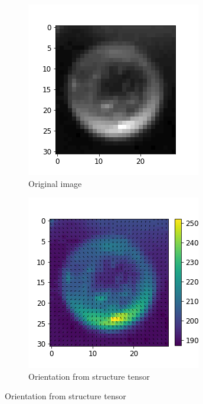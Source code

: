 		\begin{figure}
			\begin{subfigure}[t]{.4\textwidth}
				\centering
				\includegraphics[scale=0.5]{images/struct_tensor_original.png}
				\caption{Original image}		
			\end{subfigure}\hfill
			\begin{subfigure}[t]{.4\textwidth}
				\includegraphics[scale=0.5]{images/struct_tensor_orientation.png}
				\caption{Orientation from structure tensor}		
			\end{subfigure}
			

\end{figure}
